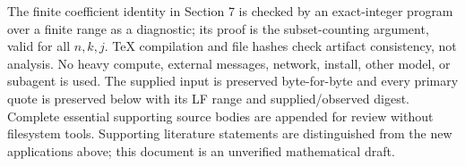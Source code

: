 \documentclass[
  10pt,
]{article}
\begin{document}
The finite coefficient identity in Section 7 is checked by an
exact-integer program over a finite range as a diagnostic; its proof is
the subset-counting argument, valid for all \(n,k,j\). TeX compilation
and file hashes check artifact consistency, not analysis. No heavy
compute, external messages, network, install, other model, or subagent
is used. The supplied input is preserved byte-for-byte and every primary
quote is preserved below with its LF range and supplied/observed digest.
Complete essential supporting source bodies are appended for review
without filesystem tools. Supporting literature statements are
distinguished from the new applications above; this document is an
unverified mathematical draft.
\end{document}
